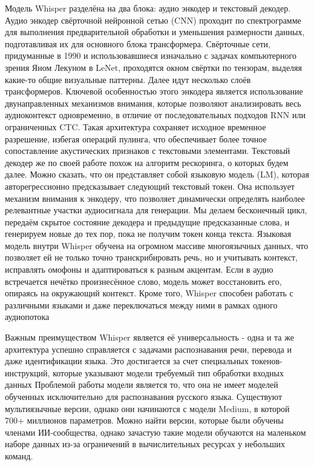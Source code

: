 Модель Whisper разделёна на два блока: аудио энкодер и текстовый декодер.
Аудио энкодер свёрточной нейронной сетью (CNN) проходит по спектрограмме для выполнения предварительной обработкн и уменьшения размерности данных, подготавливая их для основного блока трансформера.
Свёрточные сети, придуманные в 1990 и использовавшиеся изначально с задачах компьютерного зрения Яном Лекуном в LeNet\cite{LeCun1989}, проходятся окном свёртки по тензорам, выделяя какие-то общие визуальные паттерны.
Далее идут несколько слоёв трансформеров.
Ключевой особенностью этого энкодера является использование двунаправленных механизмов внимания, которые позволяют анализировать весь аудиоконтекст одновременно, в отличие от последовательных подходов RNN или ограниченных CTC.
Такая архитектура сохраняет исходное временное разрешение, избегая операций пулинга, что обеспечивает более точное сопоставление акустических признаков с текстовыми элементами.
Текстовый декодер же по своей работе похож на алгоритм рескоринга, о которых будем далее.
Можно сказать, что он представляет собой языковую модель (LM), которая авторегрессионно предсказывает следующий текстовый токен.
Она использует механизм внимания к энкодеру, что позволяет динамически определять наиболее релевантные участки аудиосигнала для генерации.
Мы делаем бесконечный цикл, передаём скрытое состояние декодера и предыдущие предсказанные слова, и генерируем новые до тех пор, пока не получим токен конца текста.
Языковая модель внутри Whisper обучена на огромном массиве многоязычных данных, что позволяет ей не только точно транскрибировать речь, но и учитывать контекст, исправлять омофоны и адаптироваться к разным акцентам.
Если в аудио встречается нечётко произнесённое слово, модель может восстановить его, опираясь на окружающий контекст.
Кроме того, Whisper способен работать с различными языками и даже переключаться между ними в рамках одного аудиопотока

Важным преимуществом Whisper является её универсальность - одна и та же архитектура успешно справляется с задачами распознавания речи, перевода и даже идентификации языка.
Это достигается за счет специальных токенов-инструкций, которые указывают модели требуемый тип обработки входных данных
Проблемой работы модели является то, что она не имеет моделей обученных исключительно для распознавания русского языка.
Существуют мультиязычные версии, однако они начинаются с модели Medium, в которой 700+ миллионов параметров.
Можно найти версии, которые были обучены членами ИИ-сообщества, однако зачастую такие модели обучаются на маленьком наборе данных из-за ограничений в вычислительных ресурсах у небольших команд.

